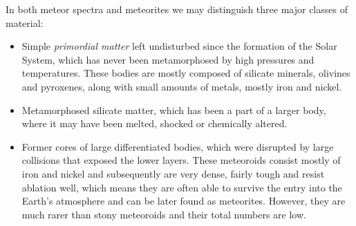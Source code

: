             In both meteor spectra and meteorites we may distinguish three major classes of material:
            \begin{itemize}
                \item Simple \emph{primordial matter} left undisturbed since the formation of the Solar System,
                    which has never been metamorphosed by high pressures and temperatures.
                    These bodies are mostly composed of silicate minerals, olivines and pyroxenes,
                    along with small amounts of metals, mostly iron and nickel.
                \item Metamorphosed silicate matter, which has been a part of a larger body,
                    where it may have been melted, shocked or chemically altered.
                \item Former cores of large differentiated bodies, which were disrupted by large collisions
                    that exposed the lower layers.
                    These meteoroids consist mostly of iron and nickel and subsequently are very dense,
                    fairly tough and resist ablation well, which means they are often able to
                    survive the entry into the Earth's atmosphere and can be later found as meteorites.
                    However, they are much rarer than stony meteoroids and their total numbers are low.
            \end{itemize}



